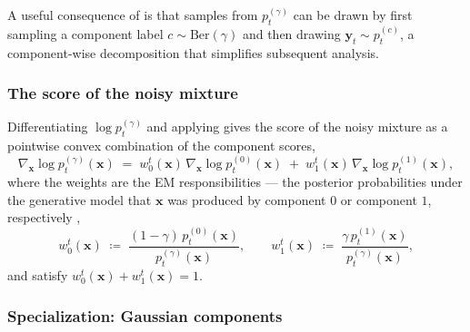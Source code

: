 \documentclass[11pt]{article}
\newcommand{\vect}[1]{\mathbf{#1}}
\theoremstyle{plain}
\newcommand{\1}{\mathbbm{1}}
\newcommand{\vx}{\vect{x}}
\newcommand{\pdist}[2][]{p_{#1}^{(#2)}}
\begin{document}
\begin{appendices}
A useful consequence of  is that samples from $\pdist[t]{\gamma}$ can be drawn by first sampling a component label $c \sim \mathrm{Ber}(\gamma)$ and then drawing $\vect{y}_t \sim \pdist[t]{c}$, a component-wise decomposition that simplifies subsequent analysis.

\subsubsection{The score of the noisy mixture}

Differentiating $\log \pdist[t]{\gamma}$ and applying  gives the score of the noisy mixture as a pointwise convex combination of the component scores,
\begin{equation}
    \nabla_{\vx} \log \pdist[t]{\gamma}({\vx})
    \;=\; w_0^t({\vx})\,\nabla_{\vx} \log \pdist[t]{0}({\vx}) \;+\; w_1^t({\vx})\,\nabla_{\vx} \log \pdist[t]{1}({\vx}),
    \label{eq:mixture-score-app}
\end{equation}
where the weights are the EM responsibilities --- the posterior probabilities under the generative model that ${\vx}$ was produced by component $0$ or component $1$, respectively \cite[\S 9.2]{10.5555/1162264},
\begin{equation}
    w_0^t({\vx}) \;\coloneqq\; \frac{(1-\gamma)\,\pdist[t]{0}({\vx})}{\pdist[t]{\gamma}({\vx})}, \qquad
    w_1^t({\vx}) \;\coloneqq\; \frac{\gamma\,\pdist[t]{1}({\vx})}{\pdist[t]{\gamma}({\vx})},
    \label{eq:mixture-weights-app}
\end{equation}
and satisfy $w_0^t({\vx}) + w_1^t({\vx}) = 1$.

\subsubsection{Specialization: Gaussian components}


\end{appendices}
\end{document}
